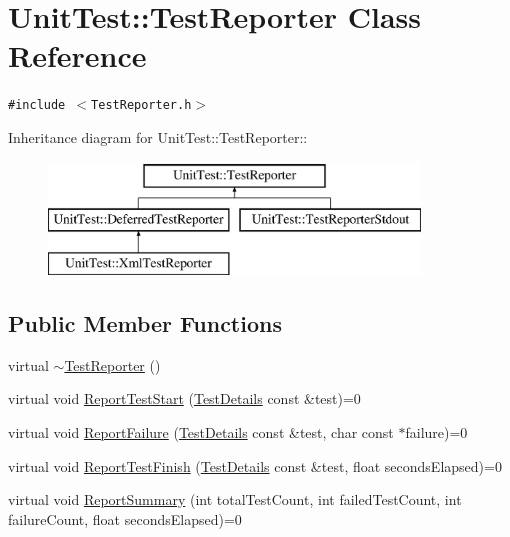 \hypertarget{class_unit_test_1_1_test_reporter}{
\section{UnitTest::TestReporter Class Reference}
\label{class_unit_test_1_1_test_reporter}
}
{\tt \#include $<$TestReporter.h$>$}

Inheritance diagram for UnitTest::TestReporter::\begin{figure}[H]
\begin{center}
\leavevmode
\includegraphics[height=3cm]{class_unit_test_1_1_test_reporter}
\end{center}
\end{figure}
\subsection*{Public Member Functions}
\begin{CompactItemize}
\item 
virtual \hyperlink{class_unit_test_1_1_test_reporter_ec56679564992823f2076b949aed31df}{$\sim$TestReporter} ()
\item 
virtual void \hyperlink{class_unit_test_1_1_test_reporter_94f1ab9311190188a2f96f8c2da785b1}{ReportTestStart} (\hyperlink{class_unit_test_1_1_test_details}{TestDetails} const \&test)=0
\item 
virtual void \hyperlink{class_unit_test_1_1_test_reporter_55195826cc03302f7a54f728c79102d5}{ReportFailure} (\hyperlink{class_unit_test_1_1_test_details}{TestDetails} const \&test, char const $\ast$failure)=0
\item 
virtual void \hyperlink{class_unit_test_1_1_test_reporter_6492379c31985a77a22f1ccf684e44da}{ReportTestFinish} (\hyperlink{class_unit_test_1_1_test_details}{TestDetails} const \&test, float secondsElapsed)=0
\item 
virtual void \hyperlink{class_unit_test_1_1_test_reporter_8f5010c52b4be55ac4796e24cc669274}{ReportSummary} (int totalTestCount, int failedTestCount, int failureCount, float secondsElapsed)=0
\end{CompactItemize}


